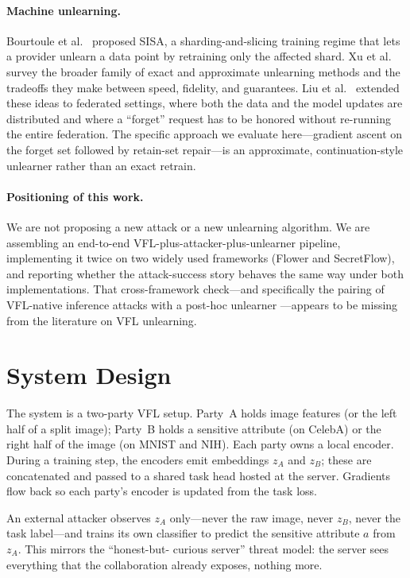 \documentclass[letterpaper,twocolumn,10pt]{article}
\begin{document}
\paragraph{Machine unlearning.}
Bourtoule et al.~\cite{bourtoule2021sisa} proposed SISA, a
sharding-and-slicing training regime that lets a provider unlearn a data
point by retraining only the affected shard. Xu et al.~\cite{xu2023survey}
survey the broader family of exact and approximate unlearning methods and
the tradeoffs they make between speed, fidelity, and guarantees. Liu et
al.~\cite{liu2021federated} extended these ideas to federated settings,
where both the data and the model updates are distributed and where a
``forget'' request has to be honored without re-running the entire
federation. The specific approach we evaluate here---gradient ascent on
the forget set followed by retain-set repair---is an approximate,
continuation-style unlearner rather than an exact retrain.

\paragraph{Positioning of this work.}
We are not proposing a new attack or a new unlearning algorithm. We are
assembling an end-to-end VFL-plus-attacker-plus-unlearner pipeline,
implementing it twice on two widely used frameworks (Flower and
SecretFlow), and reporting whether the attack-success story behaves the
same way under both implementations. That cross-framework check---and
specifically the pairing of VFL-native inference attacks
\cite{fu2022label,zhao2023provfl,chen2025urvfl,wang2025pgac} with a
post-hoc unlearner \cite{bourtoule2021sisa,liu2021federated}---appears
to be missing from the literature on VFL unlearning.

\section{System Design}

The system is a two-party VFL setup. Party~A holds image features (or the
left half of a split image); Party~B holds a sensitive attribute (on
CelebA) or the right half of the image (on MNIST and NIH). Each party
owns a local encoder. During a training step, the encoders emit
embeddings $z_A$ and $z_B$; these are concatenated and passed to a shared
task head hosted at the server. Gradients flow back so each party's
encoder is updated from the task loss.

An external attacker observes $z_A$ only---never the raw image, never
$z_B$, never the task label---and trains its own classifier to predict
the sensitive attribute $a$ from $z_A$. This mirrors the ``honest-but-
curious server'' threat model: the server sees everything that the
collaboration already exposes, nothing more.
\end{document}

